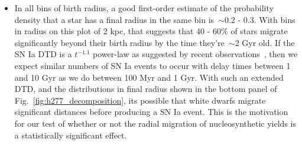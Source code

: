 \documentclass[a4paper, fleqn, usenatbib, useAMS]{mnras}
\begin{document}
\begin{itemize}
\begin{itemize}
		\item In all bins of birth radius, a good first-order estimate of the 
		probability density that a star has a final radius in the same bin 
		is~$\sim$0.2 - 0.3. With bins in radius on this plot of 2 kpc, that 
		suggests that 40 - 60\% of stars migrate significantly beyond their 
		birth radius by the time they're~$\sim$2 Gyr old. If the SN Ia DTD is a 
		$t^{-1.1}$ power-law as suggested by recent 
		observations~\citep[e.g.][]{Maoz2012, Maoz2017}, then we expect similar 
		numbers of SN Ia events to occur with delay times between 1 and 10 Gyr 
		as we do between 100 Myr and 1 Gyr. With such an extended DTD, and the 
		distributions in final radius shown in the bottom panel of 
		Fig.~\ref{fig:h277_decomposition}, its possible that white dwarfs 
		migrate significant distances before producing a SN Ia event. This is 
		the motivation for our test of whether or not the radial migration of 
		nucleosynthetic yields is a statistically significant effect. 
	\end{itemize} 
\end{itemize} 
\end{document}
